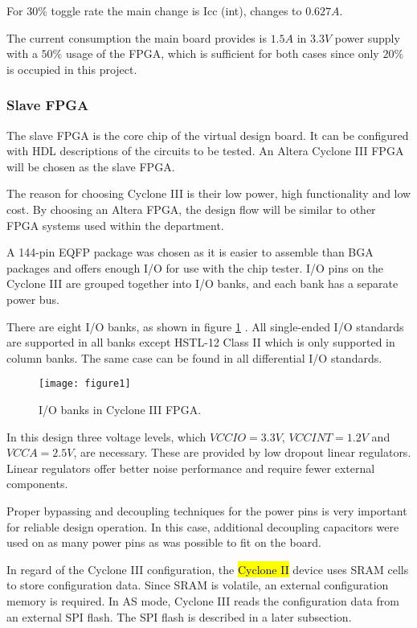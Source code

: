 For $30\%$ toggle rate the main change is Icc (int), changes to $0.627A$.

The current consumption the main board provides is $1.5A$ in $3.3V$ power supply
with a $50\%$ usage of the FPGA, which is sufficient for both cases since only $20\%$
is occupied in this project.


\subsubsection{Slave FPGA}
The slave FPGA is the core chip of the virtual design board. It can be configured
with HDL descriptions of the circuits to be tested.
An Altera Cyclone III FPGA will be chosen as the slave FPGA.

The reason for choosing Cyclone III is their low power, high functionality and low cost. By choosing
an Altera FPGA, the design flow will be similar to other FPGA systems used within the department.

A 144-pin EQFP package was chosen as it is easier to assemble than BGA packages and offers enough I/O
for use with the chip tester. I/O pins on the Cyclone III are grouped together into I/O banks,
and each bank has a separate power bus.

There are eight I/O banks, as shown in figure \ref{fig:b2_f1} \citep{Altera:2011:cyclone3handbook}.
All single-ended I/O standards are supported in all banks except HSTL-12 Class II which is only supported in column banks.
The same case can be found in all differential I/O standards.

\begin{figure}
 \centering
 \texttt{[image: figure1]}
 \caption{I/O banks in Cyclone III FPGA.}
 \label{fig:b2_f1}
\end{figure}

In this design three voltage levels, which $VCCIO=3.3V$, $VCCINT= 1.2V$ and $VCCA=2.5V$, are necessary. These are provided
by low dropout linear regulators. Linear regulators offer better noise performance and require fewer external components.

Proper bypassing and decoupling techniques for the power pins is very important for reliable design operation.
In this case, additional decoupling capacitors were used on as many power pins as was possible to fit on the board.

In regard of the Cyclone III configuration, the \hl{Cyclone II} device uses SRAM cells to
store configuration data. Since SRAM is volatile, an external configuration memory is required.
In AS mode, Cyclone III reads the configuration data from an external SPI flash. The SPI
flash is described in a later subsection.

